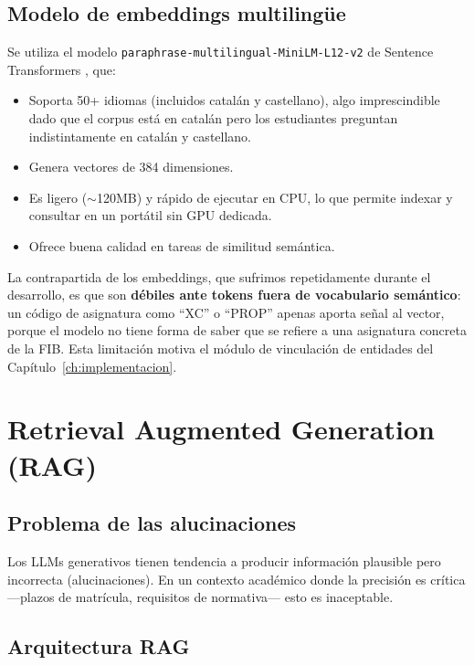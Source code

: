 \documentclass[12pt, a4paper, twoside]{report}
\begin{document}
\subsection{Modelo de embeddings multiling\"ue}

Se utiliza el modelo \texttt{paraphrase-multilingual-MiniLM-L12-v2} de Sentence Transformers \cite{reimers2019}, que:

\begin{itemize}
  \item Soporta 50+ idiomas (incluidos catal\'an y castellano), algo imprescindible dado que el corpus est\'a en catal\'an pero los estudiantes preguntan indistintamente en catal\'an y castellano.
  \item Genera vectores de 384 dimensiones.
  \item Es ligero ($\sim$120MB) y r\'apido de ejecutar en CPU, lo que permite indexar y consultar en un port\'atil sin GPU dedicada.
  \item Ofrece buena calidad en tareas de similitud sem\'antica.
\end{itemize}

La contrapartida de los embeddings, que sufrimos repetidamente durante el desarrollo, es que son \textbf{d\'ebiles ante tokens fuera de vocabulario sem\'antico}: un c\'odigo de asignatura como ``XC'' o ``PROP'' apenas aporta se\~nal al vector, porque el modelo no tiene forma de saber que se refiere a una asignatura concreta de la FIB. Esta limitaci\'on motiva el m\'odulo de vinculaci\'on de entidades del Cap\'itulo~\ref{ch:implementacion}.

\section{Retrieval Augmented Generation (RAG)}

\subsection{Problema de las alucinaciones}

Los LLMs generativos tienen tendencia a producir informaci\'on plausible pero incorrecta (alucinaciones). En un contexto acad\'emico donde la precisi\'on es cr\'itica ---plazos de matr\'icula, requisitos de normativa--- esto es inaceptable.

\subsection{Arquitectura RAG}
\end{document}
